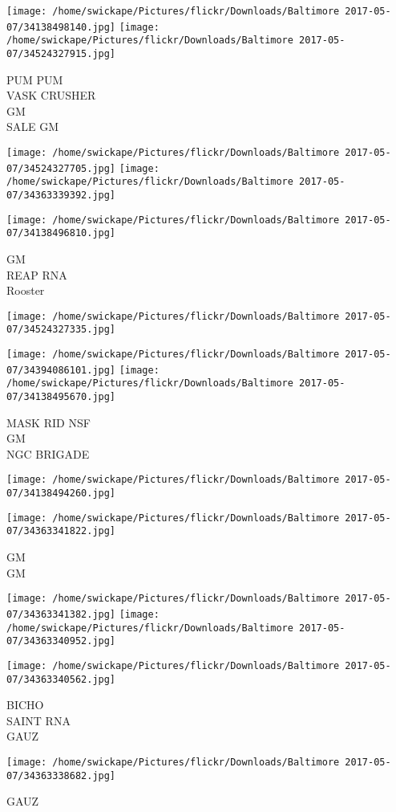 \documentclass[10pt,letterpaper]{article}
\begin{document}
\texttt{[image: /home/swickape/Pictures/flickr/Downloads/Baltimore 2017-05-07/34138498140.jpg]}
\texttt{[image: /home/swickape/Pictures/flickr/Downloads/Baltimore 2017-05-07/34524327915.jpg]}

PUM PUM\\
VASK CRUSHER\\
GM\\
SALE GM\\
\pagebreak

\texttt{[image: /home/swickape/Pictures/flickr/Downloads/Baltimore 2017-05-07/34524327705.jpg]}
\texttt{[image: /home/swickape/Pictures/flickr/Downloads/Baltimore 2017-05-07/34363339392.jpg]}

\texttt{[image: /home/swickape/Pictures/flickr/Downloads/Baltimore 2017-05-07/34138496810.jpg]}

GM\\
REAP RNA\\
Rooster\\
\pagebreak

\texttt{[image: /home/swickape/Pictures/flickr/Downloads/Baltimore 2017-05-07/34524327335.jpg]}

\vspace{0.25in}
\texttt{[image: /home/swickape/Pictures/flickr/Downloads/Baltimore 2017-05-07/34394086101.jpg]}
\texttt{[image: /home/swickape/Pictures/flickr/Downloads/Baltimore 2017-05-07/34138495670.jpg]}

MASK RID NSF\\
GM\\
NGC BRIGADE\\
\pagebreak

\texttt{[image: /home/swickape/Pictures/flickr/Downloads/Baltimore 2017-05-07/34138494260.jpg]}

\vspace{0.25in}
\texttt{[image: /home/swickape/Pictures/flickr/Downloads/Baltimore 2017-05-07/34363341822.jpg]}

GM\\
GM\\
\pagebreak

\texttt{[image: /home/swickape/Pictures/flickr/Downloads/Baltimore 2017-05-07/34363341382.jpg]}
\texttt{[image: /home/swickape/Pictures/flickr/Downloads/Baltimore 2017-05-07/34363340952.jpg]}

\vspace{0.25in}
\texttt{[image: /home/swickape/Pictures/flickr/Downloads/Baltimore 2017-05-07/34363340562.jpg]}

BICHO\\
SAINT RNA\\
GAUZ\\
\pagebreak

\texttt{[image: /home/swickape/Pictures/flickr/Downloads/Baltimore 2017-05-07/34363338682.jpg]}

GAUZ\\
\pagebreak
\end{document}
